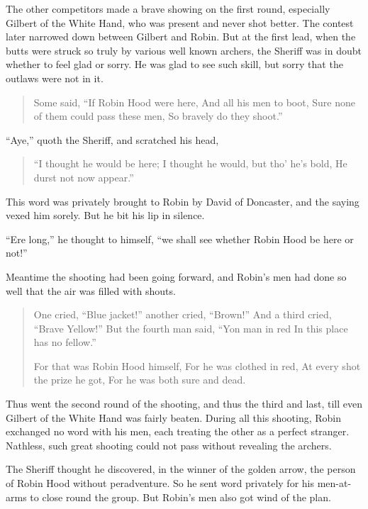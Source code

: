 The other competitors made a brave showing on the first round,
especially Gilbert of the White Hand, who was present and never shot
better. The contest later narrowed down between Gilbert and Robin. But
at the first lead, when the butts were struck so truly by various well
known archers, the Sheriff was in doubt whether to feel glad or sorry.
He was glad to see such skill, but sorry that the outlaws were not in
it.

\begin{quote}
Some said, “If Robin Hood were here,
And all his men to boot,
Sure none of them could pass these men,
So bravely do they shoot.”
\end{quote}

``Aye,'' quoth the Sheriff, and scratched his head,

\begin{quote}
“I thought he would be here;
I thought he would, but tho’ he’s bold,
He durst not now appear.”
\end{quote}

This word was privately brought to Robin by David of Doncaster, and the
saying vexed him sorely. But he bit his lip in silence.

``Ere long,'' he thought to himself, ``we shall see whether Robin Hood
be here or not!''

Meantime the shooting had been going forward, and Robin's men had done
so well that the air was filled with shouts.

\begin{quote}
One cried, “Blue jacket!” another cried, “Brown!”
    And a third cried, “Brave Yellow!”
    But the fourth man said, “Yon man in red
In this place has no fellow.”

For that was Robin Hood himself,
For he was clothed in red,
At every shot the prize he got,
For he was both sure and dead.
\end{quote}

Thus went the second round of the shooting, and thus the third and last,
till even Gilbert of the White Hand was fairly beaten. During all this
shooting, Robin exchanged no word with his men, each treating the other
as a perfect stranger. Nathless, such great shooting could not pass
without revealing the archers.

The Sheriff thought he discovered, in the winner of the golden arrow,
the person of Robin Hood without peradventure. So he sent word privately
for his men-at-arms to close round the group. But Robin's men also got
wind of the plan.

